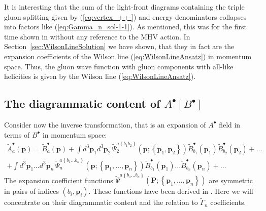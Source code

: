\documentclass[english,american]{article}
\begin{document}
It is interesting that the sum of the light-front diagrams containing
the triple gluon splitting given by (\ref{eq:vertex_++-}) and energy denominators
collapses into factors like (\ref{eq:Gamma_n_sol-1-1}). As mentioned,
this was for the first time shown in \citep{Motyka2009} without any
reference to the MHV action. In Section~\ref{sec:WilsonLineSolution}
we have shown, that they in fact are the expansion coefficients of
the Wilson line (\ref{eq:WilsonLineAnsatz}) in momentum space. Thus,
the gluon wave function  with gluon components with all-like helicities  is given  by the
Wilson line (\ref{eq:WilsonLineAnsatz}).


\subsection{The diagrammatic content of $A^{\bullet}\left[B^{\bullet}\right]$}
\label{sub:A[B]}
Consider now the inverse transformation, that is an expansion of $A^{\bullet}$
field in terms of $B^{\bullet}$ in momentum space:
\begin{multline}
\tilde{A}_{a}^{\bullet}\left(\mathbf{p}\right)=\tilde{B}_{a}^{\bullet}\left(\mathbf{p}\right)+\int d^{3}\mathbf{p}_{1}d^{3}\mathbf{p}_{2}\,\tilde{\Psi}_{2}^{a\left\{ b_{1}b_{2}\right\} }\left(\mathbf{p};\left\{ \mathbf{p}_{1},\mathbf{p}_{2}\right\} \right)\tilde{B}_{b_{1}}^{\bullet}\left(\mathbf{p}_{1}\right)\tilde{B}_{b_{2}}^{\bullet}\left(\mathbf{p}_{2}\right)+\dots\\
+\int d^{3}\mathbf{p}_{1}\dots d^{3}\mathbf{p}_{n}\,\tilde{\Psi}_{n}^{a\left\{ b_{1}\dots b_{n}\right\} }\left(\mathbf{p};\left\{ \mathbf{p}_{1},\dots,\mathbf{p}_{n}\right\} \right)\tilde{B}_{b_{1}}^{\bullet}\left(\mathbf{p}_{1}\right)\dots\tilde{B}_{b_{n}}^{\bullet}\left(\mathbf{p}_{n}\right)+\dots\,\label{eq:Az_expansion_mom}
\end{multline}
The expansion coefficient functions $\tilde{\Psi}^{a\left\{ b_{1}\dots b_{n}\right\} }\left(\mathbf{P};\left\{ \mathbf{p}_{1},\dots,\mathbf{p}_{n}\right\} \right)$
are symmetric in pairs of indices $\left(b_{i},\mathbf{p}_{i}\right)$.
These functions have been derived in \citep{Ettle2006b}. Here we
will concentrate on their diagrammatic content and the relation to $\tilde{\Gamma}_{n}$
 coefficients.
\end{document}
